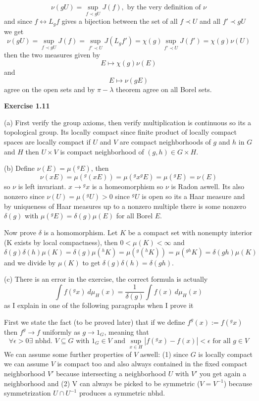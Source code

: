 \documentclass{article}
\begin{document}
$$\nu(gU) = \sup\limits_{f \prec gU} J(f), \text{ by the very definition of } \nu$$
and since $f \longleftrightarrow L_g f$ gives a bijection between the set of all $f \prec U$ and all $f' \prec gU$ we get
$$\nu(gU) =\sup\limits_{f \prec gU} J(f) = \sup\limits_{f' \prec U}J(L_gf') = \chi(g) \sup\limits_{f' \prec U}J(f') = \chi(g) \nu(U)$$
then the two measures given by $$E \mapsto \chi(g)\nu(E)$$ and $$E \mapsto \nu(gE)$$ agree on the open sets and by $\pi-\lambda$ theorem agree on all Borel sets.

\vspace{0.5cm}

\textbf{Exercise 1.11}

\vspace{0.5cm}

(a) First verify the group axioms, then verify multiplication is continuous so its a topological group. Its locally compact since finite product of locally compact spaces are locally compact if $U$ and $V$ are compact neighborhoods of $g$ and $h$ in $G$ and $H$ then $U \times V$ is compact neighborhood of $(g,h) \in G \times H$.

\vspace{0.3cm}

(b) Define $\nu(E) = \mu({}^gE)$, then $$\nu(xE) = \mu({}^g(xE)) = \mu({}^gx {}^gE) = \mu(^gE) = \nu(E)$$ so $\nu$ is left invariant. $x \rightarrow {}^gx$ is a homeomorphism so $\nu$ is Radon aswell. Its also nonzero since $\nu(U) = \mu(^gU) > 0$ since ${}^gU$ is open so its a Haar measure and by uniqueness of Haar measures up to a nonzero multiple there is some nonzero $\delta(g)$ with $\mu(^gE) = \delta(g)\mu(E)$ for all Borel $E$.

Now prove $\delta$ is a homomorphism. Let $K$ be a compact set with nonempty interior (K exists by local compactness), then $0 <\mu(K) < \infty$ and 
$$\delta(g)\delta(h) \mu(K) = \delta(g) \mu(^hK) = \mu(^g(^hK)) = \mu(^{gh}K) = \delta(gh) \mu(K)$$ 
and we divide by $\mu(K)$ to get $\delta(g)\delta(h) = \delta(gh)$.

\vspace{0.3cm}

(c) There is an error in the exercise, the correct formula is actually $$ \int f(^gx) \ d \mu_H(x) = \frac{1}{\delta(g)} \int f(x) \ d\mu_H(x)$$ as I explain in one of the following paragraphs when I prove it

\vspace{0.3cm}

First we state the fact (to be proved later) that if we define $f^g(x) := f({}^gx)$ then $f^g \rightarrow f$ uniformly as $g \rightarrow 1_G$, meaning that 
$$\forall \epsilon > 0\exists \text{ nbhd. } V \subseteq G \text{ with } 1_G \in V \text{ and } \sup\limits_{x \in H}|f({}^gx)-f(x)| < \epsilon \text{ for all } g \in V$$ 
We can assume some further properties of $V$ aswell: (1) since $G$ is locally compact we can assume $V$ is compact too and also always contained in the fixed compact neighborhood $V'$ because intersecting a neighborhood $U$ with $V'$ you get again a neighborhood and (2) V can always be picked to be symmetric ($V = V^{-1}$) because symmetrization $U \cap U^{-1}$ produces a symmetric nbhd. 
\end{document}
